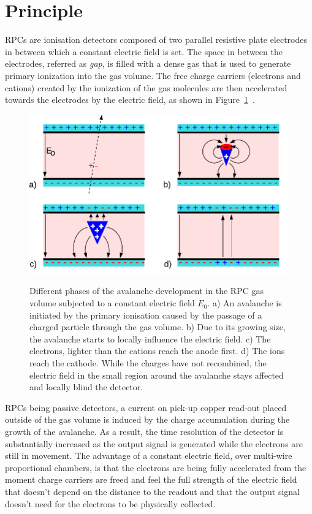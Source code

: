 \section{Principle}
\label{chapt3:sec:principle}

	RPCs are ionisation detectors composed of two parallel resistive plate electrodes in between which a constant electric field is set. The space in between the electrodes, referred as \textit{gap}, is filled with a dense gas that is used to generate primary ionization into the gas volume. The free charge carriers (electrons and cations) created by the ionization of the gas molecules are then accelerated towards the electrodes by the electric field, as shown in Figure~\ref{fig:RPC_principle}~\cite{LIPPMANN2003}.
	
	\begin{figure}[!h]
		\centering
		\includegraphics[width = \plotwidth]{fig/chapt3/RPC_principle.pdf}\\
		\caption{\label{fig:RPC_principle} Different phases of the avalanche development in the RPC gas volume subjected to a constant electric field $E_0$. a) An avalanche is initiated by the primary ionisation caused by the passage of a charged particle through the gas volume. b) Due to its growing size, the avalanche starts to locally influence the electric field. c) The electrons, lighter than the cations reach the anode first. d) The ions reach the cathode. While the charges have not recombined, the electric field in the small region around the avalanche stays affected and locally blind the detector.}
	\end{figure}
	
	RPCs being passive detectors, a current on pick-up copper read-out placed outside of the gas volume is induced by the charge accumulation during the growth of the avalanche. As a result, the time resolution of the detector is substantially increased as the output signal is generated while the electrons are still in movement. The advantage of a constant electric field, over multi-wire proportional chambers, is that the electrons are being fully accelerated from the moment charge carriers are freed and feel the full strength of the electric field that doesn't depend on the distance to the readout and that the output signal doesn't need for the electrons to be physically collected.
	
